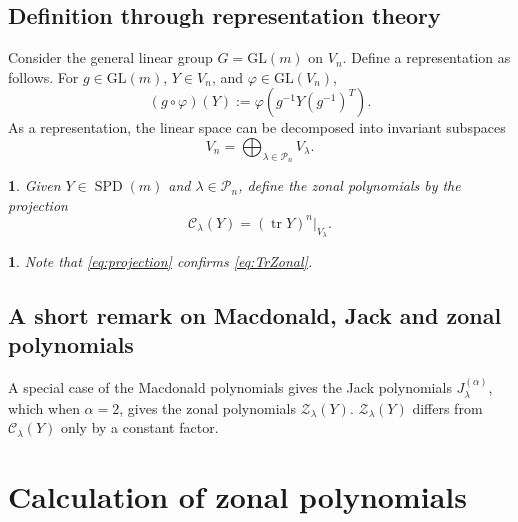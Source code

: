 \documentclass[smallextended]{svjour3}
\newtheorem{defn}[thm]{\protect\definitionname}
\newtheorem{rem}[thm]{\protect\remarkname}
\DeclareMathOperator{\Tr}{tr}
\newcommand{\SPD}{\operatorname{SPD}}
\providecommand{\definitionname}{Definition}
\providecommand{\remarkname}{Remark}
\begin{document}
\subsection{Definition through representation theory}

Consider the general linear group $G=\mathrm{GL}(m)$ on
$V_{n}$. Define a representation as follows. For $g\in\mathrm{GL}(m)$, $Y\in V_n$, and $\varphi\in\mathrm{GL}(V_n)$, 
\[
\left(g\circ\varphi\right)(Y):=\varphi{\left(g^{-1}Y(g^{-1})^{T}\right)}.
\]
As a representation, the linear space can be decomposed into invariant
subspaces \cite[p.~611]{Representation}
\[
V_{n}=\bigoplus_{\lambda\in\mathcal{P}_{n}}V_{\lambda}.
\]

\begin{defn}
Given $Y\in \SPD(m)$ and $\lambda\in\mathcal{P}_{n}$, define the zonal polynomials by
the projection
\begin{equation}
\mathcal{C}_{\lambda}(Y)=(\Tr Y)^{n}\Big|_{V_{\lambda}}.\label{eq:projection}
\end{equation}
\end{defn}
\begin{rem}
Note that \eqref{eq:projection} confirms \eqref{eq:TrZonal}. 
\end{rem}

\subsection{A short remark on Macdonald, Jack and zonal polynomials}

A special case of the Macdonald polynomials gives the Jack polynomials $J_{\lambda}^{(\alpha)}$,
which when $\alpha=2$, gives the zonal polynomials $\mathcal{Z}_\lambda(Y)$. $\mathcal{Z}_\lambda(Y)$ differs from $\mathcal{C}_\lambda(Y)$ only by a constant factor. 

\section{Calculation of zonal polynomials}\label{sec:calc}
\end{document}
